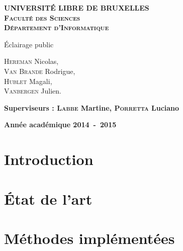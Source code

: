 \documentclass[a4paper,10pt]{report}
\begin{document}
\begin{titlepage}
\begin{center}
\textbf{\textsc{UNIVERSIT\'E LIBRE DE BRUXELLES}}\\
\textbf{\textsc{Faculté des Sciences}}\\
\textbf{\textsc{Département d'Informatique}}
\vfill{}\vfill{}
\begin{center}{\Huge \'Eclairage public}\end{center}{\Huge \par}
\begin{center}{\large \textsc{Hereman} Nicolas,\\\textsc{Van Brande} Rodrigue,\\\textsc{Hublet} Magali,\\\textsc{Vanbergen} Julien.}\end{center}{\Huge \par}
\vfill{}\vfill{}
\begin{flushleft}{\large \textbf{Superviseurs : \textsc{Labbe} Martine, \textsc{Porretta} Luciano}}\hfill{}\end{flushleft}{\large\par}
\vfill{}\vfill{}\enlargethispage{3cm}
\textbf{Année académique 2014~-~2015}
\end{center}
\end{titlepage}

\begin{abstract}
Ce rapport présente les différentes méthodes possibles afin de résoudre des problèmes d'emplacement et propose de les appliquer et les analyser dans un cas bien concret : l'éclairage public dans les parcs.
\end{abstract}


\tableofcontents

\chapter{Introduction}


\chapter{État de l'art}


\chapter{Méthodes implémentées}

\end{document}
